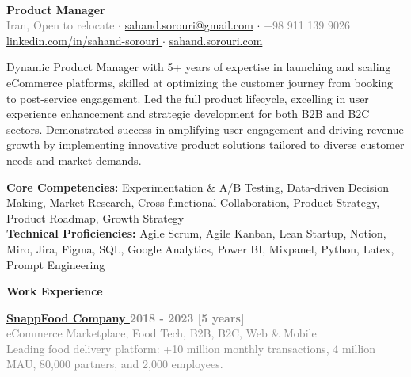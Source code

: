 \documentclass[a4paper,10.9pt]{article}
\newcommand{\sectiontitle}[1]{
  \begin{tcolorbox}[colback=black, colupper=white, sharp corners, boxrule=0pt, boxsep=3pt, left=0pt, right=0pt, top=1pt, bottom=1pt]
    \Large\bfseries #1
  \end{tcolorbox}
}
\newcommand{\majorposition}[1]{{\hspace{0pt}\Large\bfseries #1}\vspace{0.2em}}
\newcommand{\graytext}[1]{\textcolor{grey}{#1}} %
\newcommand{\boxedtext}[1]{\begin{mybox}#1\end{mybox}}
\begin{document}
\thispagestyle{empty}
\begin{center}
\\
\vspace{7pt}
{\textbf{\LARGE{Product Manager}}}\\
\normalsize
\graytext{Iran, Open to relocate} $\cdot$ \href{mailto:sahand.sorouri@gmail.com}{sahand.sorouri@gmail.com} $\cdot$ \graytext{+98 911 139 9026}
\\
\href{https://linkedin.com/in/sahand-sorouri}{linkedin.com/in/sahand-sorouri \faExternalLink{}} $\cdot$ \href{https://sahand.sorouri.com}{sahand.sorouri.com \faExternalLink{}}
\end{center}
{Dynamic Product Manager with 5+ years of expertise in launching and scaling eCommerce platforms, skilled at optimizing the customer journey from booking to post-service engagement. Led the full product lifecycle, excelling in user experience enhancement and strategic development for both B2B and B2C sectors. Demonstrated success in amplifying user engagement and driving revenue growth by implementing innovative product solutions tailored to diverse customer needs and market demands.}
{\boxedtext{\textbf{Core Competencies: }Experimentation \& A/B Testing, Data-driven Decision Making, Market Research, Cross-functional Collaboration, Product Strategy, Product Roadmap, Growth Strategy\\
\textbf{Technical Proficiencies:} Agile Scrum, Agile Kanban, Lean Startup, Notion, Miro, Jira, Figma, SQL, Google Analytics, Power BI, Mixpanel, Python, Latex, Prompt Engineering}}
\sectiontitle{Work Experience}
{\majorposition{\href{https://snappfood.ir}{SnappFood Company \faExternalLink{}}} \hfill\Large{\textbf{\graytext{2018 - 2023 [5 years]}}}}\\
{\small{\graytext{eCommerce Marketplace, Food Tech, B2B, B2C, Web \& Mobile}}\\
\small\graytext{Leading food delivery platform: +10 million monthly transactions, 4 million MAU, 80,000 partners, and 2,000 employees.}}
\vspace{5pt}
\end{document}
